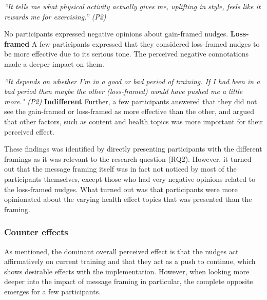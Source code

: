 \textit{“It tells me what physical activity actually gives me, uplifting in style, feels like it rewards me for exercising.” (P2)}

 No participants expressed negative opinions about gain-framed nudges.
\bigbreak
\textbf{Loss-framed}
\bigbreak
A few participants expressed that they considered loss-framed nudges to be more effective due to its serious tone. The perceived negative connotations made a deeper impact on them. 

\textit{“It depends on whether I'm in a good or bad period of training. If I had been in a bad period then maybe the other (loss-framed) would have pushed me a little more." (P2)}
\bigbreak
\textbf{Indifferent}
\bigbreak
Further, a few participants answered that they did not see the gain-framed or loss-framed as more effective than  the other, and argued that other factors, such as content and health topics was more important for their perceived effect. 


These findings was identified by directly presenting participants with the different framings as it was relevant to the research question (RQ2). However, it turned out that the message framing itself was in fact not noticed by most of the participants themselves, except those who had very negative opinions related to the loss-framed nudges. What turned out was that participants were more opinionated about the varying health effect topics that was presented than the framing.

\subsubsection{Counter effects}
As mentioned, the dominant overall perceived effect is that the nudges act affirmatively on current training and that they act as a push to continue, which shows desirable effects with the implementation. However, when looking more deeper into the impact of message framing in particular, the complete opposite emerges for a few participants. 

